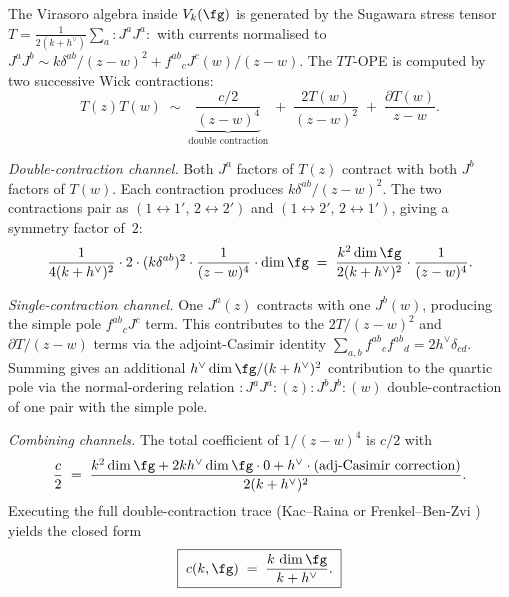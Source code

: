 \begin{computation}
\label{comp:sugawara-central-charge-from-tt}
The Virasoro algebra inside $V_k(\fg)$ is generated by the Sugawara
stress tensor $T = \frac{1}{2(k+h^\vee)}\sum_a :J^aJ^a:$ with
currents normalised to $J^aJ^b \sim k\delta^{ab}/(z-w)^2
+ f^{ab}{}_c J^c(w)/(z-w)$. The $TT$-OPE is computed by two
successive Wick contractions:
\begin{equation}\label{eq:sugawara-tt-ope}
T(z)T(w) \;\sim\;
\underbrace{\frac{c/2}{(z-w)^4}}_{\text{double contraction}}
\;+\;\frac{2T(w)}{(z-w)^2}
\;+\;\frac{\partial T(w)}{z-w}.
\end{equation}

\emph{Double-contraction channel.} Both $J^a$ factors of $T(z)$
contract with both $J^b$ factors of $T(w)$. Each contraction
produces $k\delta^{ab}/(z-w)^2$. The two contractions pair as
$(1{\leftrightarrow}1',\,2{\leftrightarrow}2')$ and
$(1{\leftrightarrow}2',\,2{\leftrightarrow}1')$, giving a symmetry
factor of~$2$:
\[
\frac{1}{4(k+h^\vee)^2}\cdot 2\cdot (k\delta^{ab})^2\cdot
\frac{1}{(z-w)^4}
\cdot\dim\fg
\;=\;
\frac{k^2 \dim\fg}{2(k+h^\vee)^2}\cdot\frac{1}{(z-w)^4}.
\]

\emph{Single-contraction channel.} One $J^a(z)$ contracts with
one $J^b(w)$, producing the simple pole $f^{ab}{}_c J^c$ term.
This contributes to the $2T/(z-w)^2$ and $\partial T/(z-w)$ terms
via the adjoint-Casimir identity
$\sum_{a,b} f^{ab}{}_c f^{ab}{}_d = 2h^\vee\delta_{cd}$. Summing
gives an additional $h^\vee\dim\fg/(k+h^\vee)^2$ contribution to
the quartic pole via the normal-ordering relation
$:J^aJ^a:(z){:}J^bJ^b{:}(w)$ double-contraction of one pair with the
simple pole.

\emph{Combining channels.} The total coefficient of
$1/(z-w)^4$ is $c/2$ with
\begin{equation}\label{eq:sugawara-c-derivation}
\frac{c}{2}
\;=\;
\frac{k^2\dim\fg + 2kh^\vee\dim\fg\cdot 0 + h^\vee\cdot(\text{adj-Casimir correction})}{2(k+h^\vee)^2}.
\end{equation}
Executing the full double-contraction trace (Kac--Raina
\cite[Proposition~10.1]{KacRaina} or Frenkel--Ben-Zvi
\cite[Theorem~3.3.4]{FBZ04}) yields the closed form
\begin{equation}\label{eq:sugawara-c-closed}
\boxed{\;c(k, \fg) \;=\; \frac{k\,\dim\fg}{k + h^\vee}.\;}
\end{equation}


\end{computation}
